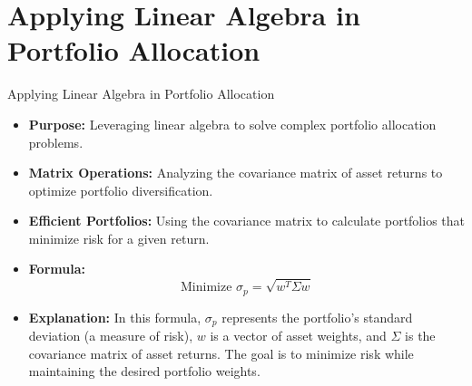 \documentclass{beamer}
\begin{document}
\section{Applying Linear Algebra in Portfolio Allocation}
\begin{frame}{Applying Linear Algebra in Portfolio Allocation}
    \begin{itemize}
        \item \textbf{Purpose:} Leveraging linear algebra to solve complex portfolio allocation problems.
        \item \textbf{Matrix Operations:} Analyzing the covariance matrix of asset returns to optimize portfolio diversification.
        \item \textbf{Efficient Portfolios:} Using the covariance matrix to calculate portfolios that minimize risk for a given return.
        \item \textbf{Formula:}
        \begin{equation*}
            \text{Minimize } \sigma_p = \sqrt{w^T \Sigma w}
        \end{equation*}
        \item \textbf{Explanation:} In this formula, \( \sigma_p \) represents the portfolio's standard deviation (a measure of risk), \( w \) is a vector of asset weights, and \( \Sigma \) is the covariance matrix of asset returns. The goal is to minimize risk while maintaining the desired portfolio weights.
    \end{itemize}
\end{frame}
\end{document}
